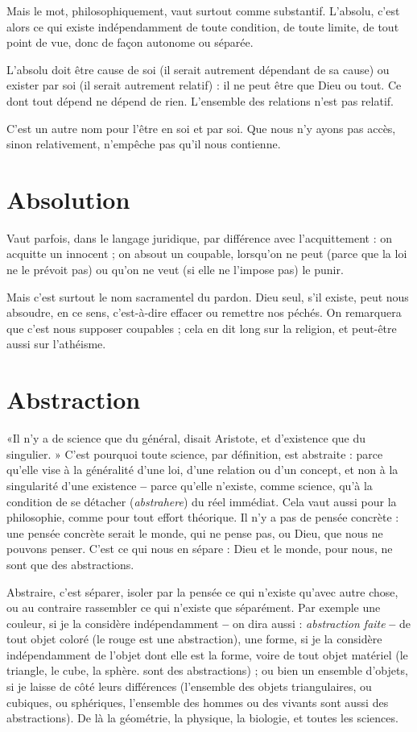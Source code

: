 Mais le mot, philosophiquement, vaut surtout comme substantif. L’absolu,
c'est alors ce qui existe indépendamment de toute condition, de toute limite,
de tout point de vue, donc de façon autonome ou séparée.

L’absolu doit être cause de soi (il serait autrement dépendant de sa cause) ou
exister par soi (il serait autrement relatif) : il ne peut être que Dieu ou tout. Ce
dont tout dépend ne dépend de rien. L'ensemble des relations n’est pas relatif.

C’est un autre nom pour l'être en soi et par soi. Que nous n’y ayons pas
accès, sinon relativement, n’empêche pas qu’il nous contienne.

\section{Absolution}
Vaut parfois, dans le langage juridique, par différence avec
l’acquittement : on acquitte un innocent ; on absout un
coupable, lorsqu'on ne peut (parce que la loi ne le prévoit pas) ou qu'on ne
veut (si elle ne l’impose pas) le punir.

Mais c’est surtout le nom sacramentel du pardon. Dieu seul, s’il existe, peut
nous absoudre, en ce sens, c’est-à-dire effacer ou remettre nos péchés. On
remarquera que c’est nous supposer coupables ; cela en dit long sur la religion,
et peut-être aussi sur l’athéisme.

\section{Abstraction}
«Il n’y a de science que du général, disait Aristote, et d’existence
que du singulier. » C’est pourquoi toute science, par
définition, est abstraite : parce qu’elle vise à la généralité d’une loi, d’une relation
ou d’un concept, et non à la singularité d’une existence {\bf --} parce qu’elle
n'existe, comme science, qu’à la condition de se détacher ({\it abstrahere}) du réel
immédiat. Cela vaut aussi pour la philosophie, comme pour tout effort théorique.
Il n’y a pas de pensée concrète : une pensée concrète serait le monde, qui
ne pense pas, ou Dieu, que nous ne pouvons penser. C’est ce qui nous en
sépare : Dieu et le monde, pour nous, ne sont que des abstractions.

Abstraire, c’est séparer, isoler par la pensée ce qui n’existe qu'avec autre
chose, ou au contraire rassembler ce qui n'existe que séparément. Par exemple
une couleur, si je la considère indépendamment {\bf --} on dira aussi : {\it abstraction
faite} {\bf --} de tout objet coloré (le rouge est une abstraction), une forme, si je la
considère indépendamment de l’objet dont elle est la forme, voire de tout objet
matériel (le triangle, le cube, la sphère. sont des abstractions) ; ou bien un
ensemble d’objets, si je laisse de côté leurs différences (l’ensemble des objets
triangulaires, ou cubiques, ou sphériques, l'ensemble des hommes ou des
vivants sont aussi des abstractions). De là la géométrie, la physique, la biologie,
et toutes les sciences.

